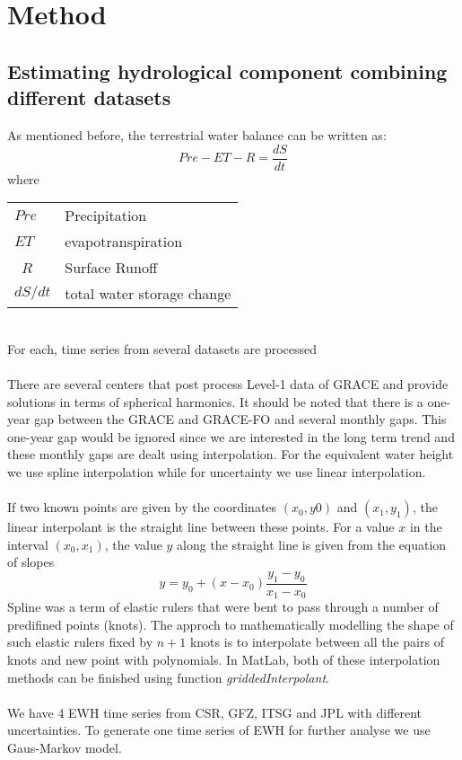 \chapter{Method}
\section{Estimating hydrological component combining different datasets}\label{section:combine}
As mentioned before, the terrestrial water balance can be written as:
\begin{equation}
Pre - ET - R = \frac{dS}{dt}
\end{equation}
where
\begin{table}[htbp]
	\begin{tabular}{ll}
		$Pre$   & Precipitation    \\ 
		$ET$    & evapotranspiration \\ \
		$R$     & Surface Runoff \\ 
		$dS / dt$ & total water storage change \\ 
	\end{tabular}
\end{table}\\
For each, time series from several datasets are processed\\\\
There are several centers that post process Level-1 data of GRACE and provide solutions in terms of spherical harmonics. It should be noted that there is a one-year gap between the GRACE and GRACE-FO and several monthly gaps. This one-year gap would be ignored since we are interested in the long term trend and these monthly gaps are dealt using interpolation. For the equivalent water height we use spline interpolation while for uncertainty we use linear interpolation.\\\\
If two known points are given by the coordinates $(x_0,y0)$ and $(x_1,y_1)$, the linear interpolant is the straight line between these points. For a value $x$ in the interval $(x_0,x_1)$, the value $y$ along the straight line is given from the equation of slopes
\begin{equation}
	y = y_0 + (x-x_0)\frac{y_1-y_0}{x_1-x_0}
\end{equation}
Spline was a term of elastic rulers that were bent to pass through a number of predifined points (knots). The approch to mathematically modelling the shape of such elastic rulers fixed by $n+1$ knots is to interpolate between all the pairs of knots and new point with polynomials. In MatLab, both of these interpolation methods can be finished using function \textit{griddedInterpolant}.\\\\
We have 4 EWH time series from CSR, GFZ, ITSG and JPL with different uncertainties. To generate one time series of EWH for further analyse we use Gaus-Markov model.
